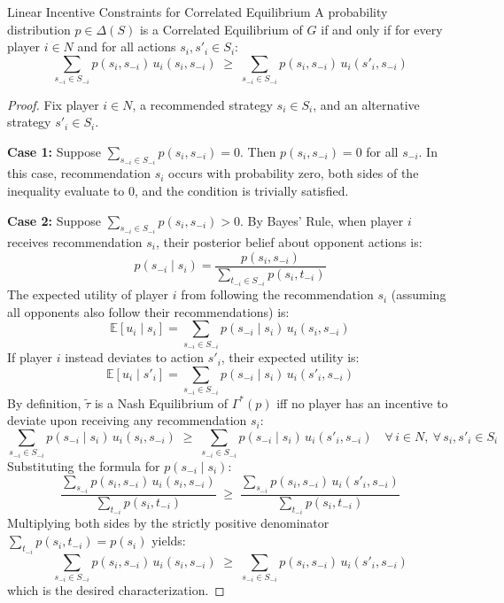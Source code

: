 \documentclass[12pt, a4paper]{article}
\begin{document}
\begin{thmbox}{Linear Incentive Constraints for Correlated Equilibrium}
A probability distribution $p \in \Delta(S)$ is a Correlated Equilibrium of $G$ if and only if for every player $i \in N$ and for all actions $s_i, s'_i \in S_i$:
\[
  \sum_{s_{-i} \in S_{-i}} p(s_i, s_{-i}) \, u_i(s_i, s_{-i}) \;\geq\; \sum_{s_{-i} \in S_{-i}} p(s_i, s_{-i}) \, u_i(s'_i, s_{-i})
\]
\end{thmbox}

\begin{proof}
Fix player $i \in N$, a recommended strategy $s_i \in S_i$, and an alternative strategy $s'_i \in S_i$.

\textbf{Case 1:} Suppose $\sum_{s_{-i} \in S_{-i}} p(s_i, s_{-i}) = 0$. Then $p(s_i, s_{-i}) = 0$ for all $s_{-i}$. In this case, recommendation $s_i$ occurs with probability zero, both sides of the inequality evaluate to 0, and the condition is trivially satisfied.

\textbf{Case 2:} Suppose $\sum_{s_{-i} \in S_{-i}} p(s_i, s_{-i}) > 0$. By Bayes' Rule, when player $i$ receives recommendation $s_i$, their posterior belief about opponent actions is:
\[
  p(s_{-i} \mid s_i) = \frac{p(s_i, s_{-i})}{\sum_{t_{-i} \in S_{-i}} p(s_i, t_{-i})}
\]
The expected utility of player $i$ from following the recommendation $s_i$ (assuming all opponents also follow their recommendations) is:
\[
  \mathbb{E}[u_i \mid s_i] = \sum_{s_{-i} \in S_{-i}} p(s_{-i} \mid s_i) \, u_i(s_i, s_{-i})
\]
If player $i$ instead deviates to action $s'_i$, their expected utility is:
\[
  \mathbb{E}[u_i \mid s'_i] = \sum_{s_{-i} \in S_{-i}} p(s_{-i} \mid s_i) \, u_i(s'_i, s_{-i})
\]
By definition, $\tilde{\tau}$ is a Nash Equilibrium of $\Gamma^*(p)$ iff no player has an incentive to deviate upon receiving any recommendation $s_i$:
\[
  \sum_{s_{-i} \in S_{-i}} p(s_{-i} \mid s_i) \, u_i(s_i, s_{-i}) \;\geq\; \sum_{s_{-i} \in S_{-i}} p(s_{-i} \mid s_i) \, u_i(s'_i, s_{-i}) \quad \forall\, i \in N,\ \forall\, s_i, s'_i \in S_i
\]
Substituting the formula for $p(s_{-i} \mid s_i)$:
\[
  \frac{\sum_{s_{-i}} p(s_i, s_{-i}) \, u_i(s_i, s_{-i})}{\sum_{t_{-i}} p(s_i, t_{-i})} \;\geq\; \frac{\sum_{s_{-i}} p(s_i, s_{-i}) \, u_i(s'_i, s_{-i})}{\sum_{t_{-i}} p(s_i, t_{-i})}
\]
Multiplying both sides by the strictly positive denominator $\sum_{t_{-i}} p(s_i, t_{-i}) = p(s_i)$ yields:
\[
  \sum_{s_{-i} \in S_{-i}} p(s_i, s_{-i}) \, u_i(s_i, s_{-i}) \;\geq\; \sum_{s_{-i} \in S_{-i}} p(s_i, s_{-i}) \, u_i(s'_i, s_{-i})
\]
which is the desired characterization.
\end{proof}
\end{document}
